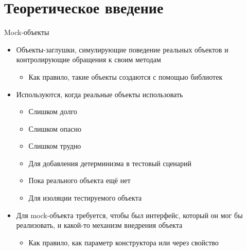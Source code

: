 \documentclass{../../slides-style}
\begin{document}
    \begin{frame}[plain]
        \titlepage
    \end{frame}

    \section{Теоретическое введение}

    \begin{frame}{Mock-объекты}
        \begin{itemize}
            \item Объекты-заглушки, симулирующие поведение реальных объектов и контролирующие обращения к своим методам
            \begin{itemize}
                \item Как правило, такие объекты создаются с помощью библиотек
            \end{itemize}
            \item Используются, когда реальные объекты использовать
            \begin{itemize}
                \item Слишком долго
                \item Слишком опасно
                \item Слишком трудно
                \item Для добавления детерминизма в тестовый сценарий
                \item Пока реального объекта ещё нет
                \item Для изоляции тестируемого объекта
            \end{itemize}
            \item Для mock-объекта требуется, чтобы был интерфейс, который он мог бы реализовать, и какой-то механизм внедрения объекта
            \begin{itemize}
                \item Как правило, как параметр конструктора или через свойство
            \end{itemize}
        \end{itemize}
    \end{frame}
\end{document}
